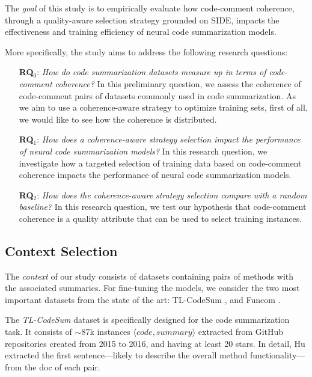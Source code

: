 The \emph{goal} of this study is to empirically evaluate how code-comment coherence, through a quality-aware selection strategy grounded on SIDE, impacts the effectiveness and training efficiency of neural code summarization models.

More specifically, the study aims to address the following research questions:

\begin{itemize}[itemindent=0.25cm]
	\item[\textbf{RQ$_{0}$}:] \textit{How do code summarization datasets measure up in terms of code-comment coherence?}
	In this preliminary question, we assess the coherence of code-comment pairs of datasets commonly used in code summarization. As we aim to use a coherence-aware strategy to optimize training sets, first of all, we would like to see how the coherence is distributed.
	\item[\textbf{RQ$_{1}$}:] \textit{How does a coherence-aware strategy selection impact the performance of neural code summarization models?}
	In this research question, we investigate how a targeted selection of training data based on code-comment coherence impacts the performance of neural code summarization models.
	\item[\textbf{RQ$_{2}$}:] \textit{How does the coherence-aware strategy selection compare with a random baseline?}
	In this research question, we test our hypothesis that code-comment coherence is a quality attribute that can be used to select training instances.
\end{itemize}

\subsection{Context Selection}
\label{subsec:context_selection}
The \emph{context} of our study consists of datasets containing pairs of \java methods with the associated summaries. 
For fine-tuning the models, we consider the two most important datasets from the state of the art: TL-CodeSum \cite{hu2018summarizing}, and Funcom \cite{leclair2019neural}.

The \textit{TL-CodeSum} dataset \cite{hu2018summarizing} is specifically designed for the code summarization task. It consists of $\sim$87k instances $ \langle code, summary \rangle$ extracted from GitHub repositories created from 2015 to 2016, and having at least 20 stars. In detail, Hu \etal \cite{hu2018summarizing} extracted the first sentence---likely to describe the overall method functionality---from the doc of each pair.

